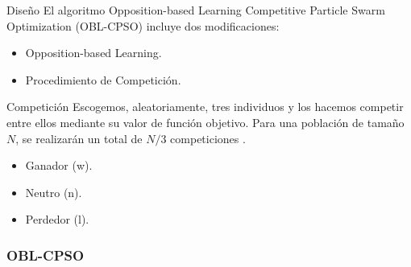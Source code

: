 \begin{frame}{}
\begin{block}{Diseño}
El algoritmo Opposition-based Learning Competitive Particle Swarm Optimization (OBL-CPSO) \citep{oblcpso} incluye dos modificaciones:
\begin{itemize}
	\item Opposition-based Learning.
	\item Procedimiento de Competición.
\end{itemize}
\end{block}

\begin{block}{Competición}
Escogemos, aleatoriamente, tres individuos y los hacemos competir entre ellos mediante su valor de función objetivo. 
Para una población de tamaño $N$, se realizarán un total de $N/3$ competiciones \citep{oblcpso}.
\begin{itemize}
  \Fontvi
  \item Ganador (w).
  \item Neutro (n).
  \item Perdedor (l).
\end{itemize}
\end{block}
\end{frame}

\begin{frame}
\frametitle{OBL-CPSO}
\centering
\end{frame}


